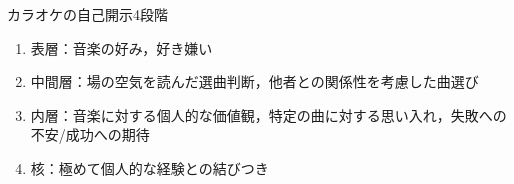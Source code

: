 カラオケの自己開示4段階
\begin{enumerate}
    \item 表層：音楽の好み，好き嫌い
    \item 中間層：場の空気を読んだ選曲判断，他者との関係性を考慮した曲選び
    \item 内層：音楽に対する個人的な価値観，特定の曲に対する思い入れ，失敗への不安/成功への期待
    \item 核：極めて個人的な経験との結びつき
\end{enumerate}

